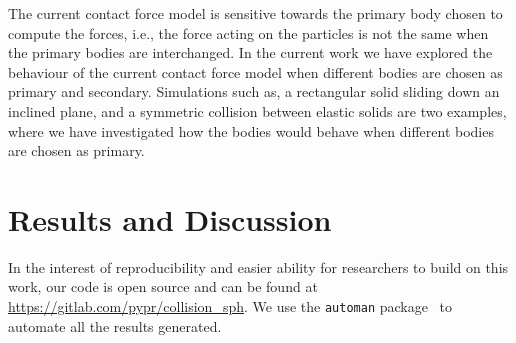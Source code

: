 The current contact force model is sensitive towards the primary body chosen
to compute the forces, i.e., the force acting on the particles is not the same
when the primary bodies are interchanged. In the current work we have explored
the behaviour of the current contact force model when different bodies are
chosen as primary and secondary. Simulations such as, a rectangular solid
sliding down an inclined plane, and a symmetric collision between elastic
solids are two examples, where we have investigated how the bodies would behave
when different bodies are chosen as primary.


\FloatBarrier%
\section{Results and Discussion}
\label{sec:results}
In the interest of reproducibility and easier ability
for researchers to build on this work, our code is open source and can be
found at \url{https://gitlab.com/pypr/collision_sph}. We use the
\texttt{automan} package~\parencite{automan2018} to automate all the results
generated.

\FloatBarrier%
